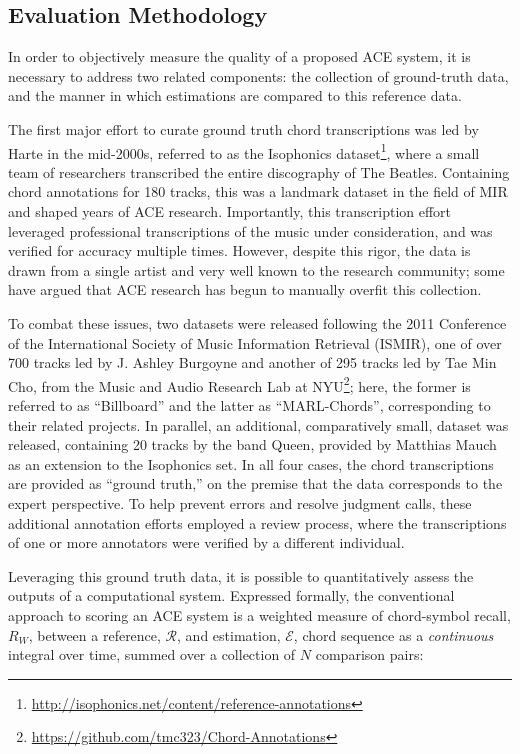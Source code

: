 \subsection{Evaluation Methodology}
\label{subsec:eval_methodology}

In order to objectively measure the quality of a proposed ACE system, it is necessary to address two related components: the collection of ground-truth data, and the manner in which estimations are compared to this reference data.

The first major effort to curate ground truth chord transcriptions was led by Harte in the mid-2000s, referred to as the Isophonics dataset\footnote{\url{http://isophonics.net/content/reference-annotations}}, where a small team of researchers transcribed the entire discography of The Beatles.
Containing chord annotations for 180 tracks, this was a landmark dataset in the field of MIR and shaped years of ACE research.
Importantly, this transcription effort leveraged professional transcriptions of the music under consideration, and was verified for accuracy multiple times.
However, despite this rigor, the data is drawn from a single artist and very well known to the research community; some have argued that ACE research has begun to manually overfit this collection.

To combat these issues, two datasets were released following the 2011 Conference of the International Society of Music Information Retrieval (ISMIR), one of over 700 tracks led by J. Ashley Burgoyne \cite{Burgoyne2011Expert} and another of 295 tracks led by Tae Min Cho, from the Music and Audio Research Lab at NYU\footnote{\url{https://github.com/tmc323/Chord-Annotations}}; here, the former is referred to as ``Billboard'' and the latter as ``MARL-Chords'', corresponding to their related projects.
In parallel, an additional, comparatively small, dataset was released, containing 20 tracks by the band Queen, provided by Matthias Mauch as an extension to the Isophonics set.
In all four cases, the chord transcriptions are provided as ``ground truth,'' on the premise that the data corresponds to the expert perspective.
To help prevent errors and resolve judgment calls, these additional annotation efforts employed a review process, where the transcriptions of one or more annotators were verified by a different individual.

Leveraging this ground truth data, it is possible to quantitatively assess the outputs of a computational system.
Expressed formally, the conventional approach to scoring an ACE system is a weighted measure of chord-symbol recall, $R_{W}$, between a reference, $\mathcal{R}$, and estimation, $\mathcal{E}$, chord sequence as a \emph{continuous} integral over time, summed over a collection of $N$ comparison pairs:

